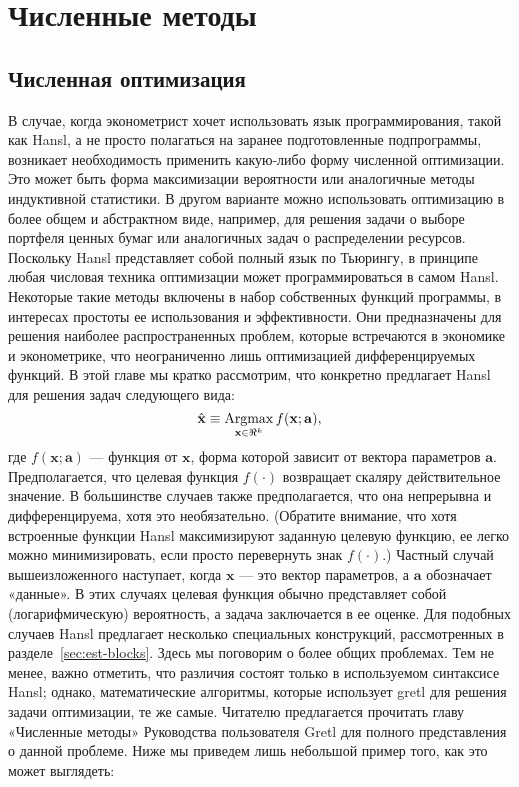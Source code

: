 \chapter{Численные методы}
\label{chap:numerical}

\section{Численная оптимизация}
\label{sec:hp-numopt}

В случае, когда эконометрист хочет использовать язык программирования,
такой как Hansl, а не просто полагаться на заранее подготовленные
подпрограммы, возникает необходимость применить какую-либо форму
численной оптимизации. Это может быть форма максимизации вероятности
или аналогичные методы индуктивной статистики. В другом варианте можно
использовать оптимизацию в более общем и абстрактном виде, например,
для решения задачи о выборе портфеля ценных бумаг или аналогичных
задач о распределении ресурсов.  Поскольку Hansl представляет собой
полный язык по Тьюрингу, в принципе любая числовая техника оптимизации
может программироваться в самом Hansl. Некоторые такие методы включены
в набор собственных функций программы, в интересах простоты ее
использования и эффективности. Они предназначены для решения наиболее
распространенных проблем, которые встречаются в экономике и
эконометрике, что неограниченно лишь оптимизацией дифференцируемых
функций.  В этой главе мы кратко рассмотрим, что конкретно предлагает
Hansl для решения задач следующего вида:
\[
\hat{\mathbf{x}} \equiv \operatorname*{\mathrm{Argmax}}_{\mathbf{x} \in \Re^k} f(\mathbf{x}; \mathbf{a}),
\]
где $f(\mathbf{x}; \mathbf{a})$ --- функция от $\mathbf{x}$, форма
которой зависит от вектора параметров $\mathbf{a}$. Предполагается,
что целевая функция $f(\cdot)$ возвращает скаляру действительное
значение. В большинстве случаев также предполагается, что она
непрерывна и дифференцируема, хотя это необязательно. (Обратите
внимание, что хотя встроенные функции Hansl максимизируют заданную
целевую функцию, ее легко можно минимизировать, если просто
перевернуть знак $f(\cdot)$.)  Частный случай вышеизложенного
наступает, когда $\mathbf{x}$ --- это вектор параметров, а
$\mathbf{a}$ обозначает «данные». В этих случаях целевая функция
обычно представляет собой (логарифмическую) вероятность, а задача
заключается в ее оценке.  Для подобных случаев Hansl предлагает
несколько специальных конструкций, рассмотренных в
разделе~\ref{sec:est-blocks}. Здесь мы поговорим о более общих
проблемах. Тем не менее, важно отметить, что различия состоят только в
используемом синтаксисе Hansl; однако, математические алгоритмы,
которые использует gretl для решения задачи оптимизации, те же самые.
Читателю предлагается прочитать главу «Численные методы» Руководства
пользователя Gretl для полного представления о данной проблеме. Ниже
мы приведем лишь небольшой пример того, как это может выглядеть:

